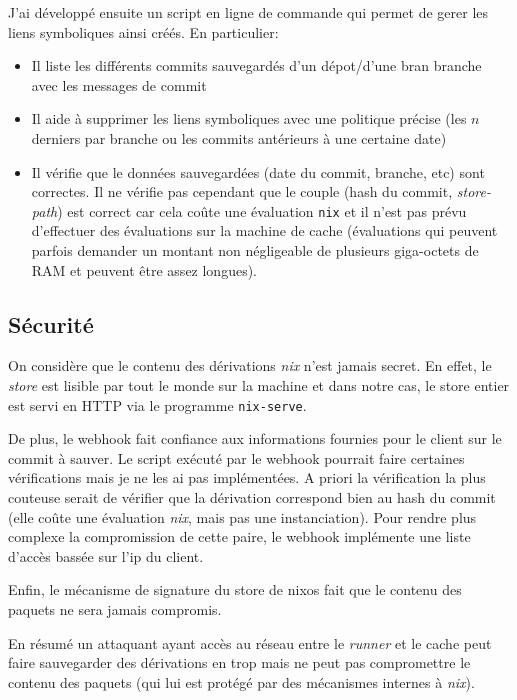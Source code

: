 \documentclass[a4paper,12pt]{article}
\begin{document}
J'ai développé ensuite un script en ligne de commande qui permet de gerer les
liens symboliques ainsi créés. En particulier:
\begin{itemize}
	\item Il liste les différents commits sauvegardés d'un dépot/d'une bran
		branche avec les messages de commit
	\item Il aide à supprimer les liens symboliques avec une politique
		précise (les $n$ derniers par branche ou les commits antérieurs à
		une certaine date)
	\item Il vérifie que le données sauvegardées (date du commit, branche,
		etc) sont correctes. Il ne vérifie pas cependant que le couple
		(hash du commit, \emph{store-path}) est correct car cela coûte
		une évaluation \texttt{nix} et il n'est pas prévu d'effectuer
		des évaluations sur la machine de cache (évaluations qui peuvent
		parfois demander un montant non négligeable de plusieurs
		giga-octets de RAM et peuvent être assez longues).

\end{itemize}

\subsection*{Sécurité}

On considère que le contenu des dérivations \emph{nix} n'est jamais secret. En effet,
le \emph{store} est lisible par tout le monde sur la machine et dans notre cas,
le store entier est servi en HTTP via le programme \texttt{nix-serve}.

De plus, le webhook fait confiance aux informations fournies pour le client sur
le commit à sauver. Le script exécuté par le webhook pourrait faire certaines
vérifications mais je ne les ai pas implémentées. A priori la vérification la
plus couteuse serait de vérifier que la dérivation correspond bien au hash du
commit (elle coûte une évaluation \emph{nix}, mais pas une instanciation). Pour
rendre plus complexe la compromission de cette paire, le webhook implémente une
liste d'accès bassée sur l'ip du client.

Enfin, le mécanisme de signature du store de nixos fait  que le contenu des
paquets ne sera jamais compromis.

En résumé un attaquant ayant accès au réseau entre le \emph{runner} et le cache
peut faire sauvegarder des dérivations en trop mais ne peut pas compromettre le
contenu des paquets (qui lui est protégé par des mécanismes internes à
\emph{nix}).
\end{document}
